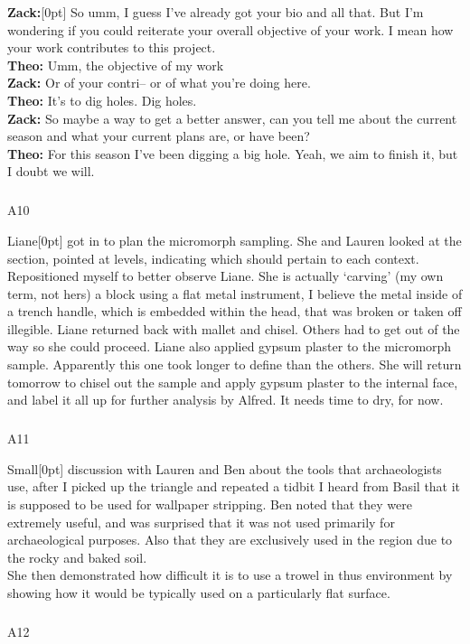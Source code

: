 \documentclass[
]{article}
\makeatletter
\let\oldsubparagraph\subparagraph
\renewcommand{\subparagraph}{
    \@ifstar
      \xxxSubParagraphStar
      \xxxSubParagraphNoStar
  }
\newcommand{\xxxSubParagraphStar}[1]{\oldsubparagraph*{#1}\mbox{}}
\newcommand{\xxxSubParagraphNoStar}[1]{\oldsubparagraph{#1}\mbox{}}
\newcommand{\paragraphnumber}[1]{\marginnote{\color{lightgray}\tiny{#1}}[0pt]}
\makeatother
\begin{document}
\textbf{Zack:}\paragraphnumber{[103]} So umm, I guess I've already got
your bio and all that. But I'm wondering if you could reiterate your
overall objective of your work. I mean how your work contributes to this
project.\\
\textbf{Theo:} Umm, the objective of my work\\
\textbf{Zack:} Or of your contri-- or of what you're doing here.\\
\textbf{Theo:} It's to dig holes. Dig holes.\\
\textbf{Zack:} So maybe a way to get a better answer, can you tell me
about the current season and what your current plans are, or have
been?\\
\textbf{Theo:} For this season I've been digging a big hole. Yeah, we
aim to finish it, but I doubt we will.

\subparagraph{A10}\label{sec-A10}

Liane\paragraphnumber{[104]} got in to plan the micromorph sampling. She
and Lauren looked at the section, pointed at levels, indicating which
should pertain to each context. Repositioned myself to better observe
Liane. She is actually `carving' (my own term, not hers) a block using a
flat metal instrument, I believe the metal inside of a trench handle,
which is embedded within the head, that was broken or taken off
illegible. Liane returned back with mallet and chisel. Others had to get
out of the way so she could proceed. Liane also applied gypsum plaster
to the micromorph sample. Apparently this one took longer to define than
the others. She will return tomorrow to chisel out the sample and apply
gypsum plaster to the internal face, and label it all up for further
analysis by Alfred. It needs time to dry, for now.

\subparagraph{A11}\label{sec-A11}

Small\paragraphnumber{[105]} discussion with Lauren and Ben about the
tools that archaeologists use, after I picked up the triangle and
repeated a tidbit I heard from Basil that it is supposed to be used for
wallpaper stripping. Ben noted that they were extremely useful, and was
surprised that it was not used primarily for archaeological purposes.
Also that they are exclusively used in the region due to the rocky and
baked soil.\\
She then demonstrated how difficult it is to use a trowel in thus
environment by showing how it would be typically used on a particularly
flat surface.

\subparagraph{A12}\label{sec-A12}
\end{document}
